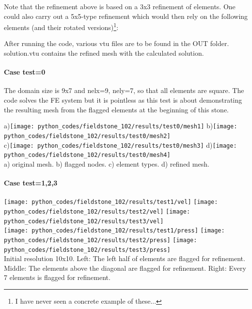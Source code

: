 Note that the refinement above is based on a 3x3 refinement of elements. One could also carry out a 5x5-type
refinement which would then rely on the following elements (and their rotated versions)\footnote{I have never
seen a concrete example of these...}:
\begin{center}

\end{center}

After running the code, various vtu files are to be found in the OUT folder.
{\filenamefont solution.vtu} contains the refined mesh with the calculated 
solution. 

\newpage
\paragraph{Case test=0}

The domain size is 9x7 and nelx=9, nely=7, so that all elements are square. 
The code solves the FE system but it is pointless as this test is about demonstrating 
the resulting mesh from the flagged elements at the beginning of this stone. 

\begin{center}
a)\texttt{[image: python\_codes/fieldstone\_102/results/test0/mesh1]}
b)\texttt{[image: python\_codes/fieldstone\_102/results/test0/mesh2]}\\
c)\texttt{[image: python\_codes/fieldstone\_102/results/test0/mesh3]}
d)\texttt{[image: python\_codes/fieldstone\_102/results/test0/mesh4]}\\
{\captionfont a) original mesh. b) flagged nodes. c) element types. d) refined mesh.}
\end{center}

\paragraph{Case test=1,2,3}

\begin{center}
\texttt{[image: python\_codes/fieldstone\_102/results/test1/vel]}
\texttt{[image: python\_codes/fieldstone\_102/results/test2/vel]}
\texttt{[image: python\_codes/fieldstone\_102/results/test3/vel]}\\
\texttt{[image: python\_codes/fieldstone\_102/results/test1/press]}
\texttt{[image: python\_codes/fieldstone\_102/results/test2/press]}
\texttt{[image: python\_codes/fieldstone\_102/results/test3/press]}\\
{\captionfont Initial resolution 10x10. 
Left: The left half of elements are flagged for refinement.
Middle: The elements above the diagonal are flagged for refinement.
Right: Every 7 elements is flagged for refinement.}
\end{center}

















